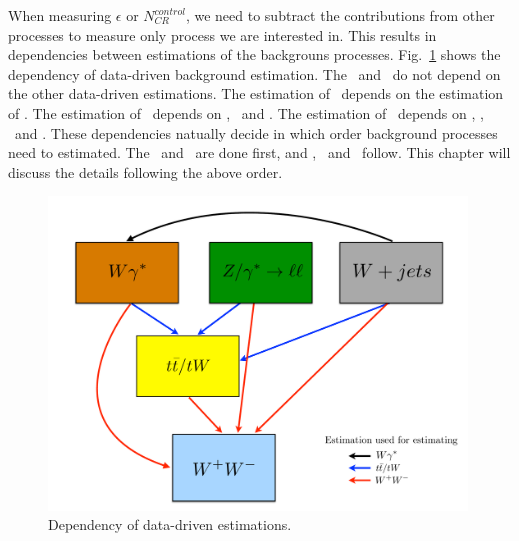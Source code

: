 When measuring $\epsilon$ or $N_{CR}^{control}$, we need to subtract 
the contributions from other processes to measure only process we 
are interested in. This results in dependencies between estimations 
of the backgrouns processes. Fig.~\ref{fig:bkgest_dependency} shows 
the dependency of data-driven background estimation. 
The \dyll\ and \Wjets\ do not depend on the other data-driven estimations. 
The estimation of \wgammastar\ depends on the estimation of \Wjets. 
The estimation of \topbkg\ depends on \wgammastar, \dyll\ and \Wjets. 
The estimation of \qqww\ depends on \wgammastar, \dyll,  \Wjets\ and \topbkg. 
These dependencies natually decide in which order background processes
need to estimated. The \dyll\ and \Wjets\ are done first, 
and \wgammastar, \topbkg\ and \qqww\ follow. This chapter will discuss 
the details following the above order. 
\begin{figure}[ht!] 
\centering 
\includegraphics[width=0.99\textwidth]{figures/bkgest_schematic.pdf} 
\caption{Dependency of data-driven estimations.} 
\label{fig:bkgest_dependency} 
\end{figure} 

\section{ \dyll }

